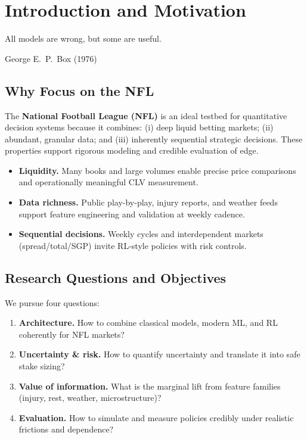 \chapter{Introduction and Motivation}
\label{chap:intro}

\epigraph{All models are wrong, but some are useful.}{George E.\ P.\ Box (1976)}


\section{Why Focus on the NFL}

The \textbf{National Football League (NFL)} is an ideal testbed for quantitative decision systems because it combines: (i) deep liquid betting markets; (ii) abundant, granular data; and (iii) inherently sequential strategic decisions. These properties support rigorous modeling and credible evaluation of edge.

\begingroup\RaggedRight\sloppy{}
\begin{itemize}
  \item \textbf{Liquidity.} Many books and large volumes enable precise price comparisons and operationally meaningful CLV measurement.
  \item \textbf{Data richness.} Public play-by-play, injury reports, and weather feeds support feature engineering and validation at weekly cadence.
  \item \textbf{Sequential decisions.} Weekly cycles and interdependent markets (spread/total/SGP) invite RL-style policies with risk controls.
\end{itemize}
\endgroup

\section{Research Questions and Objectives}

We pursue four questions:
\begin{enumerate}
  \item \textbf{Architecture.} How to combine classical models, modern ML, and RL coherently for NFL markets?
  \item \textbf{Uncertainty \& risk.} How to quantify uncertainty and translate it into safe stake sizing?
  \item \textbf{Value of information.} What is the marginal lift from feature families (injury, rest, weather, microstructure)?
  \item \textbf{Evaluation.} How to simulate and measure policies credibly under realistic frictions and dependence?
\end{enumerate}

